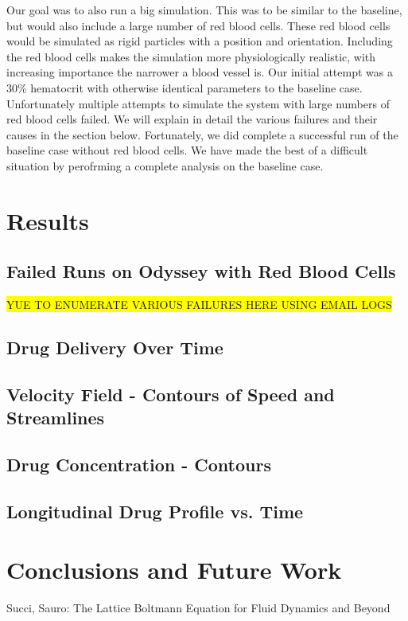 \documentclass[11pt]{article} %
\begin{document}
Our goal was to also run a big simulation.  
This was to be similar to the baseline, but would also include a large number of red blood cells.
These red blood cells would be simulated as rigid particles with a position and orientation.
Including the red blood cells makes the simulation more physiologically realistic,
with increasing importance the narrower a blood vessel is.
Our initial attempt was a 30\% hematocrit with otherwise identical parameters to the baseline case.  
Unfortunately multiple attempts to simulate the system with large numbers of red blood cells failed.
We will explain in detail the various failures and their causes in the section below.
Fortunately, we did complete a successful run of the baseline case without red blood cells.
We have made the best of a difficult situation by perofrming a complete analysis on the baseline case.

\section{Results}

\subsection{Failed Runs on Odyssey with Red Blood Cells}
\colorbox{yellow}{YUE TO ENUMERATE VARIOUS FAILURES HERE USING EMAIL LOGS}

\subsection{Drug Delivery Over Time}

\subsection{Velocity Field - Contours of Speed and Streamlines}

\subsection{Drug Concentration - Contours}

\subsection{Longitudinal Drug Profile vs. Time}

\section{Conclusions and Future Work}


\begin{thebibliography}{9}
Succi, Sauro: The Lattice Boltmann Equation for Fluid Dynamics and Beyond

\end{thebibliography}
\end{document}

